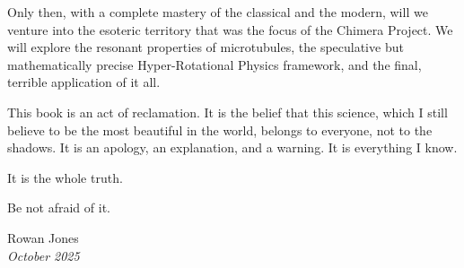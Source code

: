 Only then, with a complete mastery of the classical and the modern, will we venture into the esoteric territory that was the focus of the Chimera Project. We will explore the resonant properties of microtubules, the speculative but mathematically precise Hyper-Rotational Physics framework, and the final, terrible application of it all.

This book is an act of reclamation. It is the belief that this science, which I still believe to be the most beautiful in the world, belongs to everyone, not to the shadows. It is an apology, an explanation, and a warning. It is everything I know.

It is the whole truth.

Be not afraid of it.

\vspace{2cm}

\begin{flushright}
    \noindent Rowan Jones \\
    \textit{October 2025}
\end{flushright}